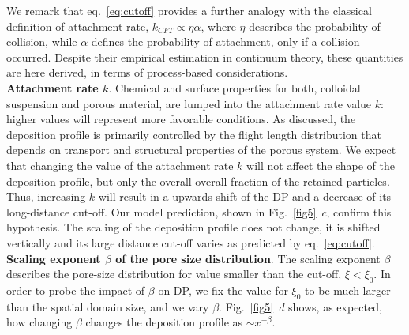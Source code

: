 \documentclass[singlecolumn,pre,notitlepage,preprintnumbers,floatfix,superscriptaddress]{revtex4-1}
\begin{document}
\noindent
We remark that eq.~\eqref{eq:cutoff} provides a further analogy with the classical definition of attachment rate, $k_{CFT} \propto \eta \alpha$, where $\eta$ describes the probability of collision, while $\alpha$ defines the probability of attachment, only if a collision occurred. Despite their empirical estimation in continuum theory, these quantities are here derived, in terms of process-based considerations.\\

\noindent
\textbf{Attachment rate $k$}.
Chemical and surface properties for both, colloidal suspension and porous material, are lumped into the attachment rate value $k$: higher values will represent more favorable conditions. As discussed, the deposition profile is primarily controlled by the flight length distribution that depends on transport and structural properties of the porous system. We expect that changing the value of the attachment rate $k$ will not affect the shape of the deposition profile, but only the overall overall fraction of the retained particles. Thus, increasing $k$ will result in a upwards shift of the DP and a decrease of its long-distance cut-off. Our model prediction, shown in Fig.~\ref{fig5}~$c$, confirm this hypothesis. The scaling of the deposition profile does not change, it is shifted vertically and its large distance cut-off varies as predicted by eq.~\eqref{eq:cutoff}.\\

\noindent
\textbf{Scaling exponent $\beta$ of the pore size distribution}.
The scaling exponent $\beta$ describes the pore-size distribution for value smaller than the cut-off, $\xi < \xi_0$. In order to probe the impact of $\beta$ on DP, we fix the value for $\xi_0$ to be much larger than the spatial domain size, and we vary $\beta$. Fig.~\ref{fig5}~$d$ shows, as expected, how changing $\beta$ changes the deposition profile as $\sim x^{-\beta}$. \\
\end{document}
